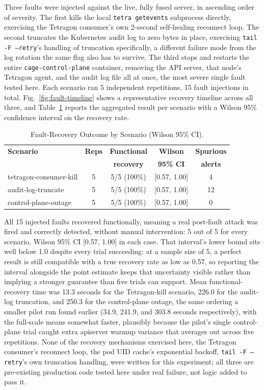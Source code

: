\documentclass{ieeeaccess}
\begin{document}
Three faults were injected against the live, fully fused server, in
ascending order of severity. The first kills the local \texttt{tetra getevents}
subprocess directly, exercising the Tetragon consumer's own 2-second
self-healing reconnect loop. The second truncates the Kubernetes audit
log to zero bytes in place, exercising \texttt{tail -F --retry}'s handling of
truncation specifically, a different failure mode from the log rotation
the same flag also has to survive. The third stops and restarts the
entire \texttt{cage-control-plane} container, removing the API server, that
node's Tetragon agent, and the audit log file all at once, the most
severe single fault tested here. Each scenario ran 5 independent
repetitions, 15 fault injections in total. Fig.~\ref{fig:fault-timeline} shows a representative
recovery timeline across all three, and Table~\ref{tab:fault-recovery} reports the
aggregated result per scenario with a Wilson 95\% confidence interval on
the recovery rate.

\begin{table}[!t]
\centering
\caption{Fault-Recovery Outcome by Scenario (Wilson 95\% CI).}
\label{tab:fault-recovery}
\tablebodyfont
\begin{tabular}{@{}lcccc@{}}
\toprule
\textbf{Scenario} & \textbf{Reps} & \textbf{Functional} & \textbf{Wilson} & \textbf{Spurious} \\
& & \textbf{recovery} & \textbf{95\% CI} & \textbf{alerts} \\
\midrule
tetragon-consumer-kill & 5 & 5/5 (100\%) & [0.57, 1.00] & 4 \\
audit-log-truncate & 5 & 5/5 (100\%) & [0.57, 1.00] & 12 \\
control-plane-outage & 5 & 5/5 (100\%) & [0.57, 1.00] & 0 \\
\bottomrule
\end{tabular}
\end{table}

All 15 injected faults recovered functionally, meaning a real
post-fault attack was fired and correctly detected, without manual
intervention: 5 out of 5 for every scenario, Wilson 95\% CI [0.57, 1.00]
in each case. That interval's lower bound sits well below 1.0 despite
every trial succeeding: at a sample size of 5, a perfect result is
still compatible with a true recovery rate as low as 0.57, so
reporting the interval alongside the point estimate keeps that
uncertainty visible rather than implying a stronger guarantee than
five trials can support. Mean functional-recovery time was 13.3
seconds for the Tetragon-kill scenario, 226.0 for the audit-log
truncation, and 250.3 for the control-plane outage, the same ordering
a smaller pilot run found earlier (34.9, 241.9, and 303.8 seconds
respectively), with the full-scale means somewhat faster, plausibly
because the pilot's single control-plane trial caught extra apiserver
warmup variance that averages out across five repetitions. None of
the recovery mechanisms exercised here, the Tetragon consumer's
reconnect loop, the pod UID cache's exponential backoff, \texttt{tail
-F --retry}'s own truncation handling, were written for this
experiment; all three are pre-existing production code tested here
under real failure, not logic added to pass it.
\end{document}
